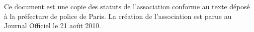 Ce document est une copie des statuts de l'association \metae{} conforme au texte déposé à la préfecture de police de Paris. La création de l'association est parue au Journal Officiel le 21 août 2010.